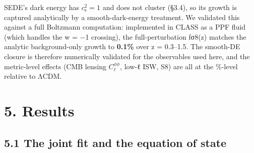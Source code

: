 \documentclass[
  10pt,
]{article}
\begin{document}
SEDE's dark energy has \(c_{\mathrm{s}}^{2} = 1\) and does not cluster
(§3.4), so its growth is captured analytically by a smooth-dark-energy
treatment. We validated this against a full Boltzmann computation:
implemented in CLASS as a PPF fluid (which handles the w = −1 crossing),
the full-perturbation fσ8(z) matches the analytic background-only growth
to \textbf{0.1\%} over z = 0.3--1.5. The smooth-DE closure is therefore
numerically validated for the observables used here, and the
metric-level effects (CMB lensing \(C_\ell ^{\phi \phi }\), low-ℓ ISW,
S8) are all at the \%-level relative to ΛCDM.

\section{5. Results}\label{results}

\subsection{5.1 The joint fit and the equation of
state}\label{the-joint-fit-and-the-equation-of-state}
\end{document}
